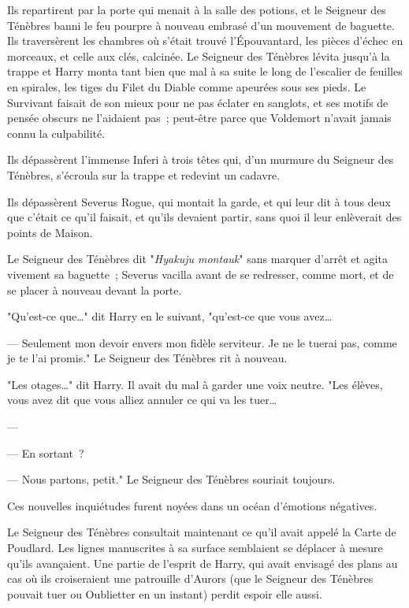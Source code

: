 Ils repartirent par la porte qui menait à la salle des potions, et le Seigneur des Ténèbres banni le feu pourpre à nouveau embrasé d'un mouvement de baguette. Ils traversèrent les chambres où s'était trouvé l'Épouvantard, les pièces d'échec en morceaux, et celle aux clés, calcinée. Le Seigneur des Ténèbres lévita jusqu'à la trappe et Harry monta tant bien que mal à sa suite le long de l'escalier de feuilles en spirales, les tiges du Filet du Diable comme apeurées sous ses pieds. Le Survivant faisait de son mieux pour ne pas éclater en sanglots, et ses motifs de pensée obscurs ne l'aidaient pas~; peut-être parce que Voldemort n'avait jamais connu la culpabilité.

Ils dépassèrent l'immense Inferi à trois têtes qui, d'un murmure du Seigneur des Ténèbres, s'écroula sur la trappe et redevint un cadavre.

Ils dépassèrent Severus Rogue, qui montait la garde, et qui leur dit à tous deux que c'était ce qu'il faisait, et qu'ils devaient partir, sans quoi il leur enlèverait des points de Maison.

Le Seigneur des Ténèbres dit "\emph{Hyakuju montauk}" sans marquer d'arrêt et agita vivement sa baguette~; Severus vacilla avant de se redresser, comme mort, et de se placer à nouveau devant la porte.

"Qu'est-ce que…" dit Harry en le suivant, "qu'est-ce que vous avez…

--- Seulement mon devoir envers mon fidèle serviteur. Je ne le tuerai pas, comme je te l'ai promis." Le Seigneur des Ténèbres rit à nouveau.

"Les otages…" dit Harry. Il avait du mal à garder une voix neutre. "Les élèves, vous avez dit que vous alliez annuler ce qui va les tuer…

--- 

--- En sortant~?

--- Nous partons, petit." Le Seigneur des Ténèbres souriait toujours.

Ces nouvelles inquiétudes furent noyées dans un océan d'émotions négatives.

Le Seigneur des Ténèbres consultait maintenant ce qu'il avait appelé la Carte de Poudlard. Les lignes manuscrites à sa surface semblaient se déplacer à mesure qu'ils avançaient. Une partie de l'esprit de Harry, qui avait envisagé des plans au cas où ils croiseraient une patrouille d'Aurors (que le Seigneur des Ténèbres pouvait tuer ou Oublietter en un instant) perdit espoir elle aussi.

